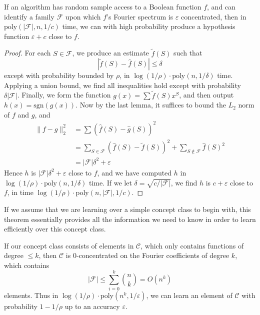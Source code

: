 \begin{theorem}
    If an algorithm has random sample access to a Boolean function $f$, and can identify a family $\mathcal{F}$ upon which $f$'s Fourier spectrum is $\varepsilon$ concentrated, then in $\text{poly}(|\mathcal{F}|, n, 1/c)$ time, we can with high probability produce a hypothesis function $\varepsilon + c$ close to $f$.
\end{theorem}
\begin{proof}
    For each $S \in \mathcal{F}$, we produce an estimate $\widetilde{f}(S)$ such that
    \[ |\widetilde{f}(S) - \widehat{f}(S)| \leq \delta \]
    except with probability bounded by $\rho$, in $\log(1/\rho) \cdot \text{poly}(n,1/\delta)$ time. Applying a union bound, we find all inequalities hold except with probability $\delta |\mathcal{F}|$. Finally, we form the function $g(x) = \sum \tilde{f}(S) x^S$, and then output $h(x) = \text{sgn}(g(x))$. Now by the last lemma, it suffices to bound the $L_2$ norm of $f$ and $g$, and
    \begin{align*}
        \| f - g \|_2^2 &= \sum \left( \widehat{f}(S) - \widehat{g}(S) \right)^2\\
        &= \sum_{S \in \mathcal{F}} \left( \widehat{f}(S) - \tilde{f}(S) \right)^2 + \sum_{S \not \in \mathcal{F}} \widehat{f}(S)^2\\
        &= |\mathcal{F}| \delta^2 + \varepsilon
    \end{align*}
    Hence $h$ is $|\mathcal{F}| \delta^2 + \varepsilon$ close to $f$, and we have computed $h$ in $\log(1/\rho) \cdot \text{poly}(n,1/\delta)$ time. If we let $\delta = \sqrt{c/|\mathcal{F}|}$, we find $h$ is $c + \varepsilon$ close to $f$, in time $\log(1/\rho) \cdot \text{poly}(n,|\mathcal{F}|, 1/c)$.
\end{proof}

If we assume that we are learning over a simple concept class to begin with, this theorem essentially provides all the information we need to know in order to learn efficiently over this concept class.

\begin{example}
    If our concept class consists of elements in $\mathcal{C}$, which only contains functions of degree $\leq k$, then $\mathcal{C}$ is 0-concentrated on the Fourier coefficients of degree $k$, which contains
    \[ |\mathcal{F}| \leq \sum_{i = 0}^k {n \choose k} = O(n^k) \]
    elements. Thus in $\log(1/\rho) \cdot \text{poly}(n^k,1/\varepsilon)$, we can learn an element of $\mathcal{C}$ with probability $1 - 1/\rho$ up to an accuracy $\varepsilon$.
\end{example}

